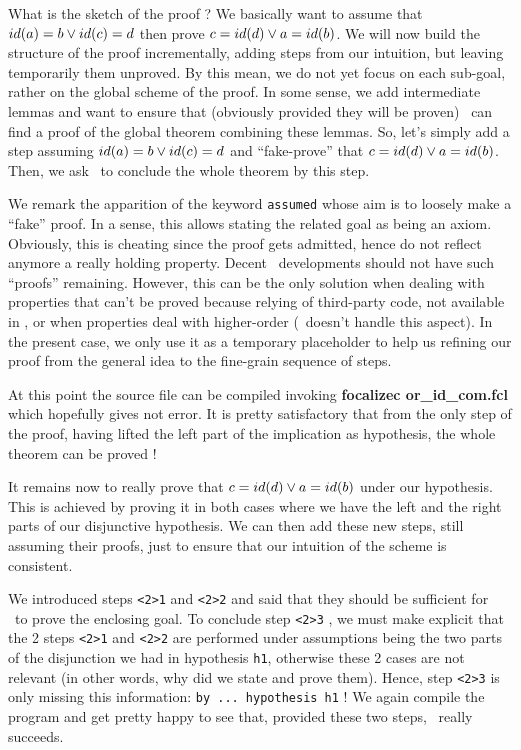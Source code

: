 \documentclass[11pt,a4paper,twoside,onecolumn,fullpage]{article}
\begin{document}
\medskip
What is the sketch of the proof ? We basically want to assume that
$id (a) = b \vee id (c) = d$ then prove $c = id (d) \vee a = id
(b)$. We will now build the structure of the proof incrementally,
adding steps from our intuition, but leaving temporarily them
unproved. By this mean, we do not yet focus on each sub-goal, rather
on the global scheme of the proof. In some sense, we add intermediate
lemmas and want to ensure that (obviously provided they will be proven)
\zenon\ can find a proof of the global theorem combining these
lemmas. So, let's simply add a step assuming $id (a) = b \vee id (c) = d$
and ``fake-prove'' that $c = id (d) \vee a = id (b)$. Then, we ask
\zenon\ to conclude the whole theorem by this step.

{\scriptsize
}

We remark the apparition of the keyword \lstinline"assumed" whose aim
is to loosely make a ``fake'' proof. In a sense, this allows stating
the related goal as being an axiom. Obviously, this is cheating since
the proof gets admitted, hence do not reflect anymore a really holding
property. Decent \focal\ developments should not have such ``proofs''
remaining. However, this can be the only solution when dealing with
properties that can't be proved because relying of third-party code,
not available in \focal, or when properties deal with higher-order
(\zenon\ doesn't handle this aspect). In the present case, we
only use it as a temporary placeholder to help us refining our proof
from the general idea to the fine-grain sequence of steps.

At this point the source file can be compiled invoking
\textbf{focalizec or\_id\_com.fcl} which hopefully gives not
error. It is pretty satisfactory that from the only step of the proof,
having lifted the left part of the implication as hypothesis, the
whole theorem can be proved !

\medskip
It remains now to really prove that $c = id (d) \vee a = id(b)$ under
our hypothesis. This is achieved by proving it in both cases where we
have the left and the right parts of our disjunctive hypothesis. We
can then add these new steps, still assuming their proofs, just to
ensure that our intuition of the scheme is consistent.

{\scriptsize
}

We introduced steps \verb"<2>1" and \verb"<2>2" and said that they
should be sufficient for \zenon\ to prove the enclosing goal.
To conclude
step \lstinline"<2>3" , we must make explicit that the 2 steps
\lstinline"<2>1" and \lstinline"<2>2" are performed under assumptions
being the two parts of the disjunction we had in hypothesis
\lstinline"h1", otherwise these 2 cases are not relevant (in other
words, why did we state and prove them). Hence, step
\lstinline"<2>3" is only missing this information:
\lstinline"by ... hypothesis h1" !
We again
compile the program and get pretty happy to see that, provided these
two steps, \zenon\ really succeeds.
\end{document}
